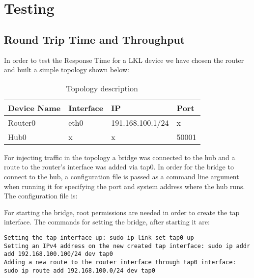 \chapter{Testing}
\label{ch-testing}

\section{Round Trip Time and Throughput}
\label{sec:rt-troughput}

In order to test the Response Time for a LKL device we have chosen the router and built a simple topology shown below:
\begin{center}
  \begin{table}[htb]
  \begin{center}
  \begin{tabular}{| l | l | l | l |}
    \hline
      Device Name & Interface & IP & Port \\ \hline
      Router0 & eth0 & 191.168.100.1/24 & x \\ \hline
      Hub0 & x & x & 50001\\ \hline
    \hline
  \end{tabular}
  \end{center}
  \caption{Topology description}
  \label{table:resp-time}
  \end{table}
\end{center}


For injecting traffic in the topology a bridge was connected to the hub and a route to the router's interface was added via tap0. In order for the bridge to connect to the hub, a configuration file is passed as a command line argument when running it for specifying the port and system address where the hub runs.
The  configuration file is: 
\lstset{language=TeX, caption=Bridge configuration file}

For starting the bridge, root permissions are needed in order to create the tap interface.
The commands for setting the bridge, after starting it are:
\lstset{language=TeX,caption=Commands for configuring the bridge,label=test-bridge-config}
\begin{lstlisting}
Setting the tap interface up: sudo ip link set tap0 up
Setting an IPv4 address on the new created tap interface: sudo ip addr add 192.168.100.100/24 dev tap0
Adding a new route to the router interface through tap0 interface: sudo ip route add 192.168.100.0/24 dev tap0
\end{lstlisting}


